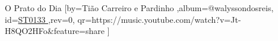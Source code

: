 \beginsong
{O Prato do Dia %
}[by={Tião Carreiro e Pardinho %
},album={@walyssondosreis},
id={\href{https://music.youtube.com/watch?v=Jt-H8QO2HFo&feature=share %
}{ST0133 %
}},rev={0}, %
qr={https://music.youtube.com/watch?v=Jt-H8QO2HFo&feature=share %
}]
\beginverse
